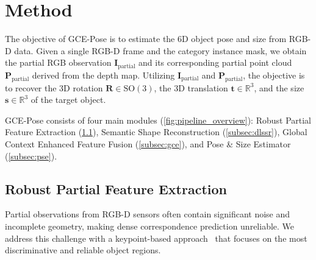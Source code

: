 \section{Method} \label{sec:method}
The objective of GCE-Pose is to estimate the 6D object pose and size from RGB-D data. Given a single RGB-D frame and the category instance mask, we obtain the partial RGB observation $\mathbf{I}_{\text{partial}}$ and its corresponding partial point cloud $\mathbf{P}_{\text{partial}}$ derived from the depth map. Utilizing $\mathbf{I}_{\text{partial}}$ and $\mathbf{P}_{\text{partial}}$, the objective is to recover the 3D rotation \( \mathbf{R} \in \text{SO}(3) \), the 3D translation \( \mathbf{t} \in \mathbb{R}^3 \), and the size \( \mathbf{s} \in \mathbb{R}^3 \) of the target object.

GCE-Pose consists of four main modules (\cref{fig:pipeline_overview}): Robust Partial Feature Extraction (\cref{subsec:keypoint_feature}), Semantic Shape Reconstruction (\cref{subsec:dlssr}), Global Context Enhanced Feature Fusion (\cref{subsec:gce}), and Pose \& Size Estimator (\cref{subsec:pse}).

\subsection{Robust Partial Feature Extraction}
\label{subsec:keypoint_feature}
Partial observations from RGB-D sensors often contain significant noise and incomplete geometry, making dense correspondence prediction unreliable. We address this challenge with a keypoint-based approach~\cite{lin2024instance} that focuses on the most discriminative and reliable object regions.

